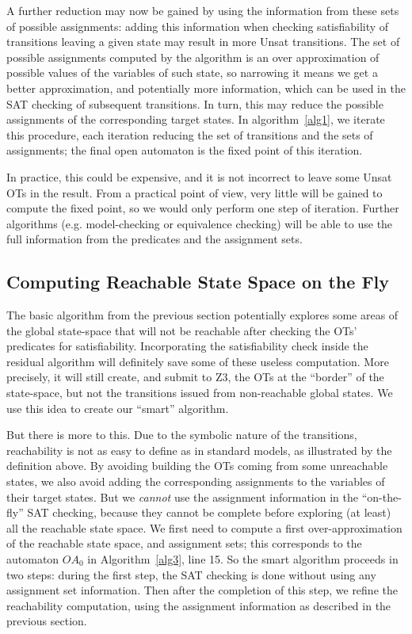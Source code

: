 \documentclass[smallcondensed]{svjour3}
\begin{document}
A further reduction may now be gained by using the information from
these sets of possible assignments: adding this information when
checking satisfiability of transitions leaving a given state may
result in more Unsat transitions. The set of possible
assignments computed by the algorithm is an over approximation of
possible values of the 
variables of such state, so narrowing it means we get a better
approximation, and potentially more information, which can be used in
the SAT checking of subsequent transitions. In turn, this may reduce the possible
assignments of the corresponding target states. In
algorithm~\ref{alg1}, we iterate this procedure, each iteration
reducing the set of 
transitions and the sets of assignments; the final open automaton
is the fixed point of this iteration.

In practice, this could be
expensive, and it is not incorrect to leave some Unsat OTs in the
result. From a  practical point of view, very little will be gained to compute the
fixed point, so we would only perform one step of iteration. Further algorithms 
(e.g. model-checking or equivalence checking) will be able to use the
full information from the predicates and the assignment sets.

\subsection{Computing Reachable State Space on the Fly}

The basic algorithm from the previous section potentially explores some
areas of the global state-space that will not be reachable after
checking the OTs' predicates for satisfiability. Incorporating the
satisfiability check inside the residual algorithm will definitely
save some of these useless computation. More precisely, it will still
create, and submit to Z3, the OTs at the ``border'' of the state-space, but
not the transitions issued from non-reachable global states. We use
this idea to create our ``smart'' algorithm.

But there is more to this. Due to the symbolic nature of the
  transitions, reachability is not as easy to define as in standard
  models, as illustrated by the definition above. By avoiding building
  the OTs coming from some unreachable states, we also avoid adding
  the corresponding assignments to the variables of their target states.
But we \emph{cannot} use the
assignment information in the ``on-the-fly'' SAT checking, because
they cannot be complete before exploring (at least) all the reachable
state space. We first need to compute a first over-approximation of
the reachable state space, and assignment sets; this corresponds to
the automaton $OA_0$ in Algorithm~\ref{alg3}, line 15.
So the smart algorithm proceeds in two steps: during the
first step, the SAT checking is done without using any assignment set
information. Then after the completion of this step, we refine the
reachability computation, using the
assignment information as described in the previous section.
 
\end{document}
